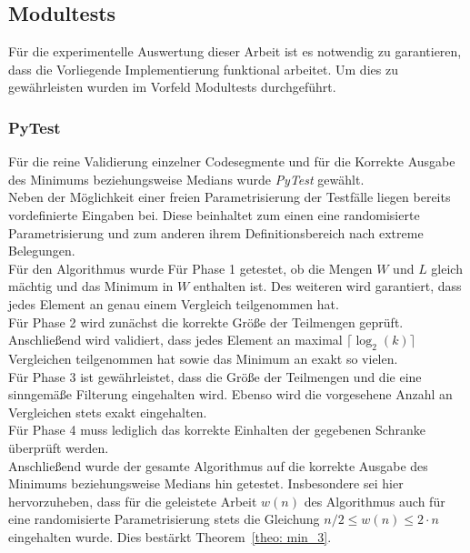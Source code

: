 \subsection{Modultests}
Für die experimentelle Auswertung dieser Arbeit ist es notwendig zu garantieren, dass die Vorliegende Implementierung funktional arbeitet. Um dies zu gewährleisten wurden im Vorfeld Modultests durchgeführt.

\subsubsection{PyTest}
Für die reine Validierung einzelner Codesegmente und für die Korrekte Ausgabe des Minimums beziehungsweise Medians wurde \textit{PyTest} gewählt.\\[.05cm]
Neben der Möglichkeit einer freien Parametrisierung der Testfälle liegen bereits vordefinierte Eingaben bei. Diese beinhaltet zum einen eine randomisierte Parametrisierung und zum anderen ihrem Definitionsbereich nach extreme Belegungen.\\[.1cm]

\noindent
Für den Algorithmus \Rm wurde Für Phase 1 getestet, ob die Mengen $W$ und $L$ gleich mächtig und das Minimum in $W$ enthalten ist. Des weiteren wird garantiert, dass jedes Element an genau einem Vergleich teilgenommen hat.\\[.03cm]
Für Phase 2 wird zunächst die korrekte Größe der Teilmengen geprüft. Anschließend wird validiert, dass jedes Element an maximal $\lceil \log_2(k)\rceil$ Vergleichen teilgenommen hat sowie das Minimum an exakt so vielen.\\[.03cm]
Für Phase 3 ist gewährleistet, dass die Größe der Teilmengen und die eine sinngemäße Filterung eingehalten wird. Ebenso wird die vorgesehene Anzahl an Vergleichen stets exakt eingehalten.\\[.03cm]
Für Phase 4 muss lediglich das korrekte Einhalten der gegebenen Schranke überprüft werden.\\[.1cm]
Anschließend wurde der gesamte Algorithmus auf die korrekte Ausgabe des Minimums beziehungsweise Medians hin getestet. Insbesondere sei hier hervorzuheben, dass für die geleistete Arbeit $w(n)$ des Algorithmus \Rm auch für eine randomisierte Parametrisierung stets die Gleichung $n/2 \leq w(n) \leq 2\cdot n$ eingehalten wurde. Dies bestärkt Theorem~\ref{theo: min_3}.\\[.1cm]

